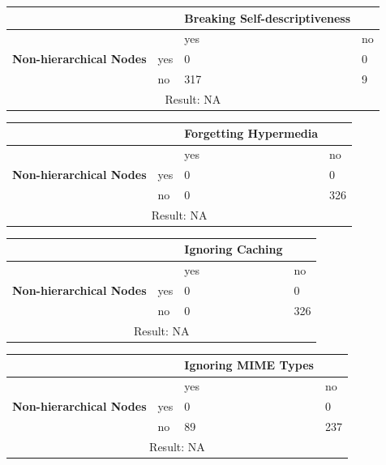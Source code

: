 \documentclass[a4paper,12pt]{article}
\begin{document}
\begin{center}
  \begin{tabular}{| p{60mm} | p{10mm} | p{35mm} | p{35mm} |}
  \hline
   & & \textbf{Breaking Self-descriptiveness} &
  \\
  \hline
  & & yes & no
  \\
  \hline
  \textbf{Non-hierarchical Nodes} & yes & 0 & 0
  \\
  \hline
   & no & 317 & 9
  \\
  \hline
  \multicolumn{4}{|c|}{Result: NA}
  \\ \hline
  \end{tabular}
  \end{center}

\begin{center}
  \begin{tabular}{| p{60mm} | p{10mm} | p{35mm} | p{35mm} |}
  \hline
   & & \textbf{Forgetting Hypermedia} &
  \\
  \hline
  & & yes & no
  \\
  \hline
  \textbf{Non-hierarchical Nodes} & yes & 0 & 0
  \\
  \hline
   & no & 0 & 326
  \\
  \hline
  \multicolumn{4}{|c|}{Result: NA}
  \\ \hline
  \end{tabular}
  \end{center}

\begin{center}
  \begin{tabular}{| p{60mm} | p{10mm} | p{35mm} | p{35mm} |}
  \hline
   & & \textbf{Ignoring Caching} &
  \\
  \hline
  & & yes & no
  \\
  \hline
  \textbf{Non-hierarchical Nodes} & yes & 0 & 0
  \\
  \hline
   & no & 0 & 326
  \\
  \hline
  \multicolumn{4}{|c|}{Result: NA}
  \\ \hline
  \end{tabular}
  \end{center}

\begin{center}
  \begin{tabular}{| p{60mm} | p{10mm} | p{35mm} | p{35mm} |}
  \hline
   & & \textbf{Ignoring MIME Types} &
  \\
  \hline
  & & yes & no
  \\
  \hline
  \textbf{Non-hierarchical Nodes} & yes & 0 & 0
  \\
  \hline
   & no & 89 & 237
  \\
  \hline
  \multicolumn{4}{|c|}{Result: NA}
  \\ \hline
  \end{tabular}
  \end{center}
\end{document}
